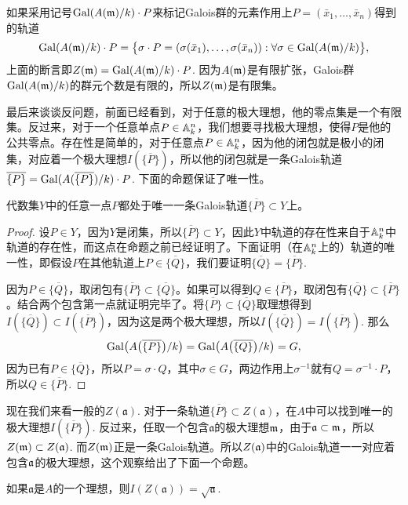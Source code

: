 \para 如果采用记号$\operatorname{Gal}(A(\mathfrak{m})/k)\cdot P$来标记Galois群的元素作用上$P=(\bar{x}_1,\dots,\bar{x}_n)$得到的轨道
\[
    \operatorname{Gal}(A(\mathfrak{m})/k)\cdot P=\bigl\{\sigma\cdot P=(\sigma(\bar{x}_1),\dots,\sigma(\bar{x}_n)):\forall \sigma\in \operatorname{Gal}(A(\mathfrak{m})/k)\bigr\},
\]
上面的断言即$Z(\mathfrak{m})=\operatorname{Gal}(A(\mathfrak{m})/k)\cdot P$. 因为$A(\mathfrak{m})$是有限扩张，Galois群$\operatorname{Gal}(A(\mathfrak{m})/k)$的群元个数是有限的，所以$Z(\mathfrak{m})$是有限集。

最后来谈谈反问题，前面已经看到，对于任意的极大理想，他的零点集是一个有限集。反过来，对于一个任意单点$P\in \mathbb{A}^n_k$，我们想要寻找极大理想，使得$P$是他的公共零点。存在性是简单的，对于任意点$P\in \mathbb{A}^n_k$，因为他的闭包就是极小的闭集，对应着一个极大理想$I(\overline{\{P\}})$，所以他的闭包就是一条Galois轨道$\overline{\{P\}}=\operatorname{Gal}(A(\overline{\{P\}})/k)\cdot P$. 下面的命题保证了唯一性。

\lem 代数集$Y$中的任意一点$P$都处于唯一一条Galois轨道$\overline{\{P\}}\subset Y$上。

\begin{proof} 设$P\in Y$，因为$Y$是闭集，所以$\overline{\{P\}}\subset Y$，因此$Y$中轨道的存在性来自于$\mathbb{A}^n_k$中轨道的存在性，而这点在命题之前已经证明了。下面证明（在$\mathbb{A}^n_k$上的）轨道的唯一性，即假设$P$在其他轨道上$P\in \overline{\{Q\}}$，我们要证明$\overline{\{Q\}}=\overline{\{P\}}$.

    因为$P\in \overline{\{Q\}}$，取闭包有$\overline{\{P\}}\subset \overline{\{Q\}}$。如果可以得到$Q\in \overline{\{P\}}$，取闭包有$\overline{\{Q\}}\subset \overline{\{P\}}$。结合两个包含第一点就证明完毕了。将$\overline{\{P\}}\subset \overline{\{Q\}}$取理想得到$I(\overline{\{Q\}})\subset I(\overline{\{P\}})$，因为这是两个极大理想，所以$I(\overline{\{Q\}})=I(\overline{\{P\}})$. 那么
    \[
        \operatorname{Gal}\bigl(A\bigl(\overline{\{P\}}\bigr)/k\bigr)=\operatorname{Gal}\bigl(A\bigl(\overline{\{Q\}}\bigr)/k\bigr)=G,
    \]
    因为已有$P\in \overline{\{Q\}}$，所以$P=\sigma \cdot Q$，其中$\sigma\in G$，两边作用上$\sigma^{-1}$就有$Q=\sigma^{-1}\cdot P$，所以$Q\in \overline{\{P\}}$. \end{proof}

\para 现在我们来看一般的$Z(\mathfrak{a})$. 对于一条轨道$\overline{\{P\}}\subset Z(\mathfrak{a})$，在$A$中可以找到唯一的极大理想$I(\overline{\{P\}})$. 反过来，任取一个包含$\mathfrak{a}$的极大理想$\mathfrak{m}$，由于$\mathfrak{a}\subset \mathfrak{m}$，所以$Z(\mathfrak{m})\subset Z(\mathfrak{a})$. 而$Z(\mathfrak{m})$正是一条Galois轨道。所以$Z(\mathfrak{a})$中的Galois轨道一一对应着包含$\mathfrak{a}$的极大理想，这个观察给出了下面一个命题。

\begin{pro}
    如果$\mathfrak{a}$是$A$的一个理想，则$I(Z(\mathfrak{a}))=\sqrt{\mathfrak{a}}$.
\end{pro}

